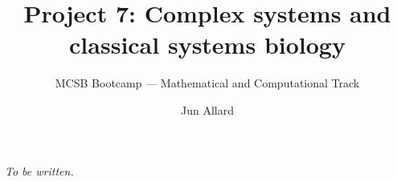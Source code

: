 \documentclass[
  letterpaper,
  DIV=11,
  numbers=noendperiod]{scrartcl}
\title{Project 7: Complex systems and classical systems biology}
\subtitle{MCSB Bootcamp --- Mathematical and Computational Track}
\author{Jun Allard}
\date{}
\begin{document}
\maketitle


\emph{To be written.}
\end{document}

